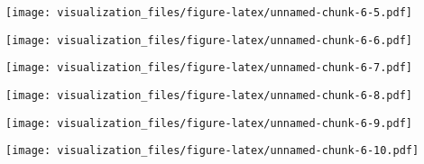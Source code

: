 \documentclass[
]{article}
\newenvironment{Shaded}{\begin{snugshade}}{\end{snugshade}}
\newcommand{\CommentTok}[1]{\textcolor[rgb]{0.56,0.35,0.01}{\textit{#1}}}
\newcommand{\FunctionTok}[1]{\textcolor[rgb]{0.00,0.00,0.00}{#1}}
\newcommand{\NormalTok}[1]{#1}
\newcommand{\SpecialCharTok}[1]{\textcolor[rgb]{0.00,0.00,0.00}{#1}}
\begin{document}
\texttt{[image: visualization\_files/figure-latex/unnamed-chunk-6-5.pdf]}

\begin{Shaded}
\end{Shaded}

\texttt{[image: visualization\_files/figure-latex/unnamed-chunk-6-6.pdf]}

\begin{Shaded}
\end{Shaded}

\texttt{[image: visualization\_files/figure-latex/unnamed-chunk-6-7.pdf]}

\begin{Shaded}
\end{Shaded}

\texttt{[image: visualization\_files/figure-latex/unnamed-chunk-6-8.pdf]}

\begin{Shaded}
\end{Shaded}

\texttt{[image: visualization\_files/figure-latex/unnamed-chunk-6-9.pdf]}

\begin{Shaded}
\end{Shaded}

\texttt{[image: visualization\_files/figure-latex/unnamed-chunk-6-10.pdf]}

\begin{Shaded}
\end{Shaded}
\end{document}
